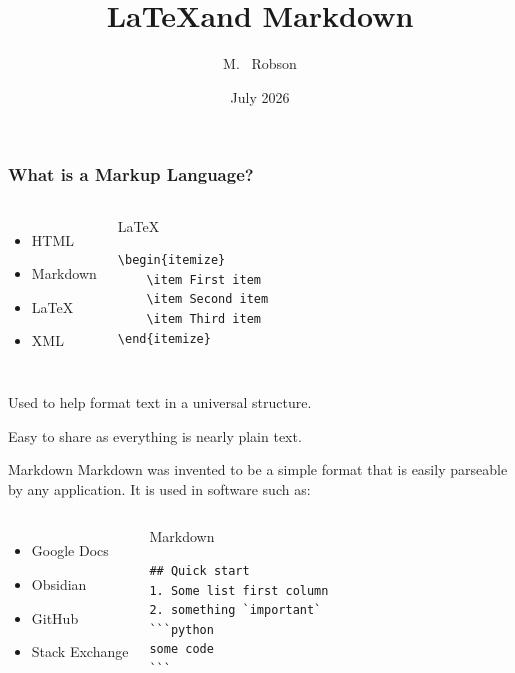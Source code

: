 \documentclass[15pt]{beamer}
\title[\LaTeX and Markdown]
{\LaTeX and Markdown}
\author[Matthew, Robson]
{M. ~Robson\inst{1}}
\institute[ICR]
{
  \inst{1}%
  Austin Branch\\
  Institute for Computing in Research
}
\date[July 2026]
{July 2026}
\begin{document}
\frame{\titlepage}

\begin{frame}[fragile]
\frametitle{What is a Markup Language?}

\begin{columns}

    \begin{itemize}
        \item HTML
        \item Markdown
        \item \LaTeX
        \item XML
    \end{itemize}
    

\begin{block}{\LaTeX}

\begin{verbatim}
\begin{itemize}
    \item First item
    \item Second item
    \item Third item
\end{itemize}
\end{verbatim}
\end{block}

\end{columns}
\vspace{1cm}
Used to help format text in a universal structure.  

\noindent Easy to share as everything is nearly plain text.

\end{frame}

\begin{frame}[fragile]{Markdown}
Markdown was invented to be a simple format that is easily parseable by any application. It is used in software such as:

\vspace{0.5cm}

\begin{columns}
    \begin{itemize}
        \item Google Docs
        \item Obsidian
        \item GitHub
        \item Stack Exchange
    \end{itemize}

\begin{block}{Markdown}

\begin{verbatim}
## Quick start
1. Some list first column
2. something `important`
```python
some code
```
\end{verbatim}
\end{block}


\end{columns}
  
\end{frame}
\end{document}
